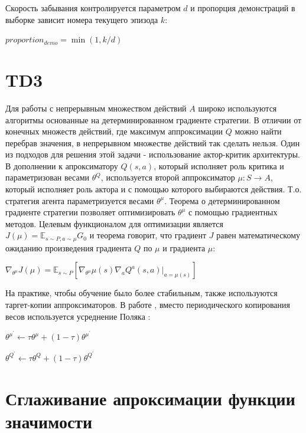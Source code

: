 \documentclass{mipt-thesis-bs}
\begin{document}
Скорость забывания контролируется параметром $d$ и пропорция демонстраций в выборке зависит номера текущего эпизода $k$:

\begin{center}
    $proportion_{demo} = \min(1, k/d)$
\end{center}

\section{TD3}

Для работы с непрерывным множеством действий $A$ широко используются алгоритмы основанные на детерминированном градиенте стратегии. В отличии от конечных множеств действий, где максимум аппроксимации $Q$ можно найти перебрав значения, в непрерывном множестве действий так сделать нельзя. Один из подходов для решения этой задачи - использование актор-критик архитектуры. В дополнении к апроксиматору $Q(s,a)$, который исполняет роль критика и параметризован весами $\theta^Q$, используется второй аппроксиматор $\mu:S\rightarrow A$, который исполняет роль актора и с помощью которого выбираются действия. Т.о. стратегия агента параметризуется весами $\theta^\mu$. Теорема о детерминированном градиенте стратегии позволяет оптимизировать $\theta^\mu$ с помощью градиентных методов. Целевым функционалом для оптимизации является $J(\mu)=\mathbb{E}_{s\sim P, a\sim\mu}G_0$ и теорема говорит, что градиент $J$ равен математическому ожиданию произведения градиента $Q$ по $\mu$ и градиента $\mu$:

\begin{center}
$\nabla_{\theta^\mu} J(\mu) =\mathbb{E}_{s \sim P}[\nabla_{\theta^\mu} \mu(s) \nabla_{a} Q^{a}(s, a)|_{a=\mu(s)}]$
\end{center}

На практике, чтобы обучение было более стабильным, также используются таргет-копии аппроксиматоров. В работе \cite{ddpg}, вместо периодического копирования весов используется усреднение Поляка \cite{polyak}:

\begin{center}
    $\theta^{\mu^{\prime}} \leftarrow \tau \theta^{\mu}+(1-\tau) \theta^{\mu^{\prime}}$
    
     $\theta^{Q^{\prime}} \leftarrow \tau \theta^{Q}+(1-\tau) \theta^{Q^{\prime}}$
\end{center}

\section{Сглаживание апроксимации функции значимости}
\end{document}

